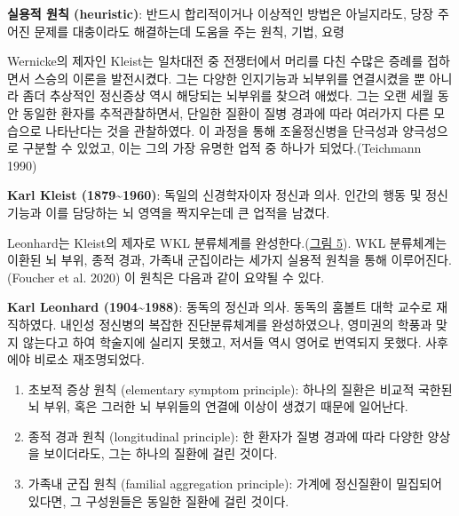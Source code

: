 \documentclass[
]{article}
\providecommand{\tightlist}{%
  \setlength{\itemsep}{0pt}\setlength{\parskip}{0pt}}
\begin{document}
\textbf{실용적 원칙 (heuristic)}: 반드시 합리적이거나 이상적인 방법은
아닐지라도, 당장 주어진 문제를 대충이라도 해결하는데 도움을 주는 원칙,
기법, 요령

Wernicke의 제자인 Kleist는 일차대전 중 전쟁터에서 머리를 다친 수많은
증례를 접하면서 스승의 이론을 발전시켰다. 그는 다양한 인지기능과
뇌부위를 연결시켰을 뿐 아니라 좀더 추상적인 정신증상 역시 해당되는
뇌부위를 찾으려 애썼다. 그는 오랜 세월 동안 동일한 환자를
추적관찰하면서, 단일한 질환이 질병 경과에 따라 여러가지 다른 모습으로
나타난다는 것을 관찰하였다. 이 과정을 통해 조울정신병을 단극성과
양극성으로 구분할 수 있었고, 이는 그의 가장 유명한 업적 중 하나가
되었다.(Teichmann 1990)

\textbf{Karl Kleist (1879\textasciitilde1960)}: 독일의 신경학자이자
정신과 의사. 인간의 행동 및 정신기능과 이를 담당하는 뇌 영역을
짝지우는데 큰 업적을 남겼다.

Leonhard는 Kleist의 제자로 WKL 분류체계를
완성한다.(\protect\hyperlink{fig:WKL}{그림 5}). WKL 분류체계는 이환된 뇌
부위, 종적 경과, 가족내 군집이라는 세가지 실용적 원칙을 통해
이루어진다.(Foucher et al. 2020) 이 원칙은 다음과 같이 요약될 수 있다.

\textbf{Karl Leonhard (1904\textasciitilde1988)}: 동독의 정신과 의사.
동독의 훔볼트 대학 교수로 재직하였다. 내인성 정신병의 복잡한
진단분류체계를 완성하였으나, 영미권의 학풍과 맞지 않는다고 하여 학술지에
실리지 못했고, 저서들 역시 영어로 번역되지 못했다. 사후에야 비로소
재조명되었다.

\begin{enumerate}
\def\labelenumi{\arabic{enumi}.}
\tightlist
\item
  초보적 증상 원칙 (elementary symptom principle): 하나의 질환은 비교적
  국한된 뇌 부위, 혹은 그러한 뇌 부위들의 연결에 이상이 생겼기 때문에
  일어난다.
\item
  종적 경과 원칙 (longitudinal principle): 한 환자가 질병 경과에 따라
  다양한 양상을 보이더라도, 그는 하나의 질환에 걸린 것이다.
\item
  가족내 군집 원칙 (familial aggregation principle): 가계에 정신질환이
  밀집되어 있다면, 그 구성원들은 동일한 질환에 걸린 것이다.
\end{enumerate}
\end{document}
